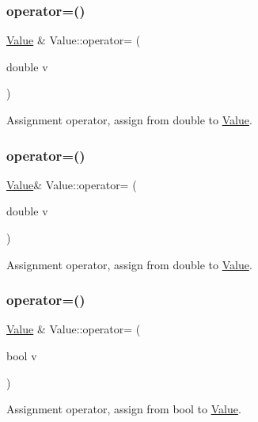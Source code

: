 \subsubsection{\texorpdfstring{operator=()}{operator=()}\hspace{0.1cm}{\footnotesize\ttfamily [13/32]}}
{\footnotesize\ttfamily \hyperlink{classValue}{Value} \& Value\+::operator= (\begin{DoxyParamCaption}\item[{double}]{v }\end{DoxyParamCaption})}

Assignment operator, assign from double to \hyperlink{classValue}{Value}. \mbox{\label{classValue_ad9936bf667613433c4788fc6bd8a3492}} 
\subsubsection{\texorpdfstring{operator=()}{operator=()}\hspace{0.1cm}{\footnotesize\ttfamily [14/32]}}
{\footnotesize\ttfamily \hyperlink{classValue}{Value}\& Value\+::operator= (\begin{DoxyParamCaption}\item[{double}]{v }\end{DoxyParamCaption})}

Assignment operator, assign from double to \hyperlink{classValue}{Value}. \mbox{\label{classValue_aa2290ea3c3f4513308dd4f132d3bbd5a}} 
\subsubsection{\texorpdfstring{operator=()}{operator=()}\hspace{0.1cm}{\footnotesize\ttfamily [15/32]}}
{\footnotesize\ttfamily \hyperlink{classValue}{Value} \& Value\+::operator= (\begin{DoxyParamCaption}\item[{bool}]{v }\end{DoxyParamCaption})}

Assignment operator, assign from bool to \hyperlink{classValue}{Value}. \mbox{\label{classValue_aafd206743bb929b271c7a597d9f18a21}} 

